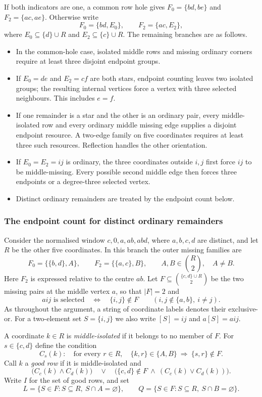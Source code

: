 \documentclass[11pt,a4paper]{article}
\theoremstyle{definition}
\theoremstyle{remark}
\begin{document}
If both indicators are one, a common row hole gives $F_0=\{bd,be\}$ and $F_2=\{ac,ae\}$. Otherwise write
\[
F_0=\{bd,E_0\},\qquad F_2=\{ac,E_2\},
\]
where $E_0\subseteq\{d\}\cup R$ and $E_2\subseteq\{c\}\cup R$. The remaining branches are as follows.
\begin{itemize}
\item In the common-hole case, isolated middle rows and missing ordinary corners require at least three disjoint endpoint groups.
\item If $E_0=de$ and $E_2=cf$ are both stars, endpoint counting leaves two isolated groups; the resulting internal vertices force a vertex with three selected neighbours. This includes $e=f$.
\item If one remainder is a star and the other is an ordinary pair, every middle-isolated row and every ordinary middle missing edge supplies a disjoint endpoint resource. A two-edge family on five coordinates requires at least three such resources. Reflection handles the other orientation.
\item If $E_0=E_2=ij$ is ordinary, the three coordinates outside $i,j$ first force $ij$ to be middle-missing. Every possible second middle edge then forces three endpoints or a degree-three selected vertex.
\item Distinct ordinary remainders are treated by the endpoint count below.
\end{itemize}

\subsubsection*{The endpoint count for distinct ordinary remainders}
Consider the normalised window $c,0,a,ab,abd$, where $a,b,c,d$ are distinct,
and let $R$ be the other five coordinates. In this branch the outer missing
families are
\[
 F_0=\{\{b,d\},A\},\qquad F_2=\{\{a,c\},B\},
 \qquad A,B\in\binom{R}{2},\quad A\ne B.
\]
Here $F_2$ is expressed relative to the centre $ab$. Let
$F\subseteq\binom{\{c,d\}\cup R}{2}$ be the two missing pairs at the middle
vertex $a$, so that $|F|=2$ and
\[
 aij\text{ is selected}\quad\Longleftrightarrow\quad\{i,j\}\notin F
 \qquad(i,j\notin\{a,b\},\ i\ne j).
\]
As throughout the argument, a string of coordinate labels denotes their
exclusive-or. For a two-element set $S=\{i,j\}$ we also write $[S]=ij$ and
$a[S]=aij$.

A coordinate $k\in R$ is \emph{middle-isolated} if it belongs to no member
of $F$. For $s\in\{c,d\}$ define the condition
\[
 C_s(k):\quad
 \text{for every }r\in R,\quad
 \{k,r\}\in\{A,B\}\ \Longrightarrow\ \{s,r\}\notin F.
\]
Call $k$ a \emph{good row} if it is middle-isolated and
\[
 \bigl(C_c(k)\wedge C_d(k)\bigr)
 \quad\vee\quad
 \bigl(\{c,d\}\notin F\ \wedge\ (C_c(k)\vee C_d(k))\bigr).
\]
Write $I$ for the set of good rows, and set
\[
 L=\{S\in F:S\subseteq R,\ S\cap A=\varnothing\},\qquad
 Q=\{S\in F:S\subseteq R,\ S\cap B=\varnothing\}.
\]
\end{document}
